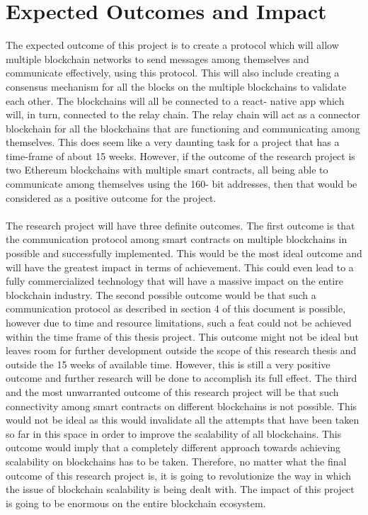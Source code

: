 \documentclass[a4paper,twoside,phd]{BYUPhys}
\begin{document}
\section{Expected Outcomes and Impact}
The expected outcome of this project is to create a protocol which will allow multiple blockchain networks to send messages among themselves and communicate effectively, using this protocol. This will also include creating a consensus mechanism for all the blocks on the multiple blockchains to validate each other. The blockchains will all be connected to a react- native app which will, in turn, connected to the relay chain. The relay chain will act as a connector blockchain for all the blockchains that are functioning and communicating among themselves. This does seem like a very daunting task for a project that has a time-frame of about 15 weeks. However, if the outcome of the research project is two Ethereum blockchains with multiple smart contracts, all being able to communicate among themselves using the 160- bit addresses, then that would be considered as a positive outcome for the project.
\\
\\
The research project will have three definite outcomes. The first outcome is that the communication protocol among smart contracts on multiple blockchains in possible and successfully implemented. This would be the most ideal outcome and will have the greatest impact in terms of achievement. This could even lead to a fully commercialized technology that will have a massive impact on the entire blockchain industry. The second possible outcome would be that such a communication protocol as described in section 4 of this document is possible, however due to time and resource limitations, such a feat could not be achieved within the time frame of this thesis project. This outcome might not be ideal but leaves room for further development outside the scope of this research thesis and outside the 15 weeks of available time. However, this is still a very positive outcome and further research will be done to accomplish its full effect. The third and the most unwarranted outcome of this research project will be that such connectivity among smart contracts on different blockchains is not possible. This would not be ideal as this would invalidate all the attempts that have been taken so far in this space in order to improve the scalability of all blockchains. This outcome would imply that a completely different approach towards achieving scalability on blockchains has to be taken. Therefore, no matter what the final outcome of this research project is, it is going to revolutionize the way in which the issue of blockchain scalability is being dealt with. The impact of this project is going to be enormous on the entire blockchain ecosystem.
\end{document}
